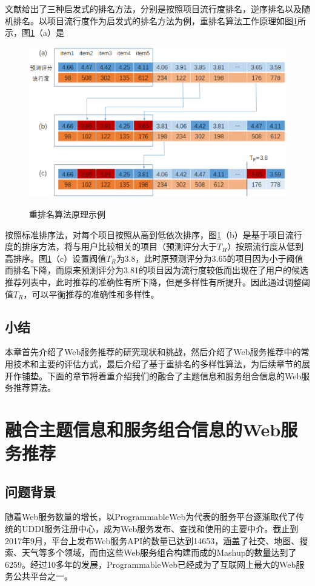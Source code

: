 \documentclass[master,winfonts]{njuthesis}
\begin{document}
文献\cite{Adomavicius2012Improving}给出了三种启发式的排名方法，分别是按照项目流行度排名，逆序排名以及随机排名。以项目流行度作为启发式的排名方法为例，重排名算法工作原理如图\ref{fig:4-1}所示，图\ref{fig:4-1}（a）是
\begin{figure}[htbp]
  \centering
  \includegraphics[width=\textwidth]{rerank_example.eps}\\
  \caption{重排名算法原理示例}\label{fig:4-1}
\end{figure}
按照标准排序法，对每个项目按照从高到低依次排序，图\ref{fig:4-1}（b）是基于项目流行度的排序方法，将与用户比较相关的项目（预测评分大于$T_H$）按照流行度从低到高排序。图\ref{fig:4-1}（c）设置阀值$T_R$为3.8，此时原预测评分为3.65的项目因为小于阈值而排名下降，而原来预测评分为3.81的项目因为流行度较低而出现在了用户的候选推荐列表中，此时推荐的准确性有所下降，但是多样性有所提升。因此通过调整阈值$T_R$，可以平衡推荐的准确性和多样性。

\section{小结}
本章首先介绍了Web服务推荐的研究现状和挑战，然后介绍了Web服务推荐中的常用技术和主要的评估方式，最后介绍了基于重排名的多样性算法，为后续章节的展开作铺垫。下面的章节将着重介绍我们的融合了主题信息和服务组合信息的Web服务推荐算法。
\chapter{融合主题信息和服务组合信息的Web服务推荐}\label{chapter_random}
\section{问题背景}
随着Web服务数量的增长，以ProgrammableWeb为代表的服务平台逐渐取代了传统的UDDI服务注册中心，成为Web服务发布、查找和使用的主要中介\cite{刘轶2016全局视角下的}。截止到2017年9月，平台上发布Web服务API的数量已达到14653，涵盖了社交、地图、搜索、天气等多个领域，而由这些Web服务组合构建而成的Mashup的数量达到了6259。经过10多年的发展，ProgrammableWeb已经成为了互联网上最大的Web服务公共平台之一。
\end{document}
